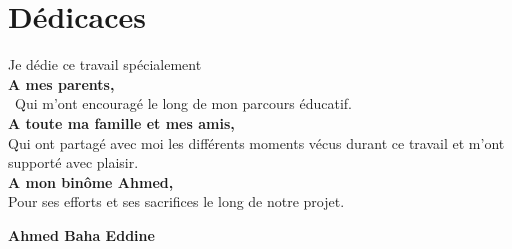 



\chapter*{Dédicaces }

\begin{center}
	
	\begin{minipage}[c]{1\columnwidth}
		
		{\large 
			\vskip1cm
			
			\centering
			Je dédie ce travail spécialement \\\vskip0.5cm\textbf{A mes parents,}\\\ Qui m'ont encouragé le long de mon parcours éducatif.\\ \vskip0.5cm
			\textbf{A toute ma famille et mes amis,}\\Qui ont partagé avec moi les différents moments vécus durant ce travail et m'ont supporté avec plaisir.\\ \vskip0.5cm
			\textbf{A mon binôme Ahmed,}\\
			Pour ses efforts et ses sacrifices le long de notre projet.
			
		}
		
		
	\end{minipage}
	
\end{center}

\vskip1.5cm
\begin{flushright}\LARGE
	\bf{Ahmed Baha Eddine}
\end{flushright}